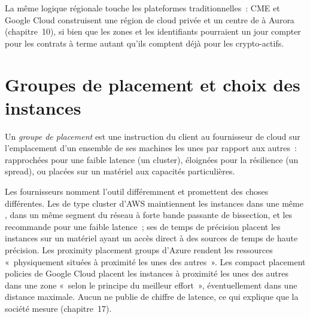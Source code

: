 La même logique régionale touche les plateformes traditionnelles~: CME et Google Cloud construisent une région de cloud privée et un centre de
 à Aurora (chapitre~10), si bien que les zones et les identifiants pourraient un jour compter pour les contrats à terme autant qu'ils comptent déjà pour les crypto-actifs.

\section{Groupes de placement et choix des instances}

\begin{definition}\label{def:nw:trading-in-a-public-cloud:pg}
Un \emph{groupe de placement} est une instruction du client au fournisseur de cloud sur l'emplacement d'un ensemble de
ses machines les unes par rapport aux autres~: rapprochées pour une faible latence (un cluster), éloignées pour la résilience (un spread), ou placées sur un matériel aux capacités particulières.
\end{definition}

Les fournisseurs nomment l'outil différemment et promettent des choses différentes. Les  de type cluster d'AWS maintiennent les instances dans une même ,
dans un même segment du réseau à forte bande passante de bissection, et les recommande pour une faible latence~; ses  de temps de précision placent
les instances sur un matériel ayant un accès direct à des sources de temps de haute précision. Les proximity placement groups d'Azure rendent les ressources «~physiquement situées
à proximité les unes des autres~». Les compact placement policies de Google Cloud placent les instances à proximité les unes des autres dans une zone «~selon le principe du meilleur effort~», éventuellement
dans une distance maximale. Aucun ne publie de chiffre de latence, ce qui explique que la société mesure (chapitre~17).

